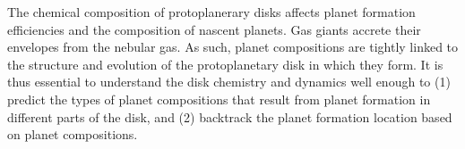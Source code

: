 \documentclass[apj]{emulateapj}
\newcommand{\emgr}[1]{\emph{ \color{gray} #1}}
\begin{document}


The chemical composition of protoplanerary disks affects planet formation efficiencies and the composition of nascent planets.
Gas giants accrete their envelopes from the nebular gas. As such, planet compositions are tightly linked to the structure and evolution of the protoplanetary disk in which they form. It is thus essential to understand the disk chemistry and dynamics well enough to (1) predict the types of planet compositions that result from planet formation in different parts of the disk, and (2) backtrack the planet formation location based on planet compositions. %





\end{document}
